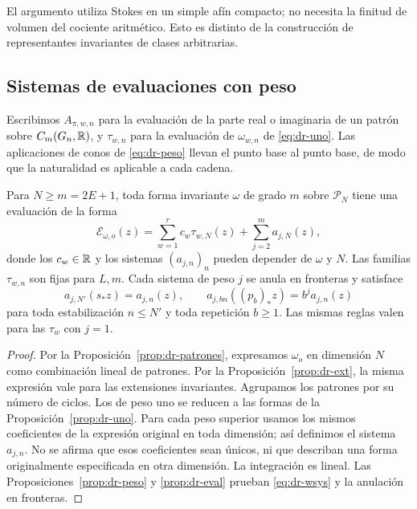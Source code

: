 El argumento utiliza Stokes en un simple afín compacto; no necesita la finitud de volumen del cociente aritmético. Esto es distinto de la construcción de representantes invariantes de clases arbitrarias.

\subsection{Sistemas de evaluaciones con peso}

Escribimos $A_{\pi,w,n}$ para la evaluación de la parte real o imaginaria de un patrón sobre $C_m(G_n,\mathbb{R})$, y $\tau_{w,n}$ para la evaluación de $\omega_{w,n}$ de \eqref{eq:dr-uno}. Las aplicaciones de conos de \eqref{eq:dr-peso} llevan el punto base al punto base, de modo que la naturalidad es aplicable a cada cadena.

\begin{teorema}
\label{thm:dr-wt}
Para $N\ge m=2E+1$, toda forma invariante $\omega$ de grado $m$ sobre $\mathcal P_N$ tiene una evaluación de la forma
\begin{equation}
 \mathcal E_{\omega,o}(z)=\sum_{w=1}^r c_w\tau_{w,N}(z)
               +\sum_{j=2}^m a_{j,N}(z),
 \label{eq:dr-decomp}
\end{equation}
donde los $c_w\in\mathbb{R}$ y los sistemas $(a_{j,n})_n$ pueden depender de $\omega$ y $N$. Las familias $\tau_{w,n}$ son fijas para $L,m$. Cada sistema de peso $j$ se anula en fronteras y satisface
\begin{equation}
 a_{j,N'}(s_*z)=a_{j,n}(z),\qquad
 a_{j,bn}((p_b)_*z)=b^j a_{j,n}(z)
 \label{eq:dr-wsys}
\end{equation}
para toda estabilización $n\le N'$ y toda repetición $b\ge1$. Las mismas reglas valen para las $\tau_w$ con $j=1$.
\end{teorema}
\begin{proof}
Por la Proposición~\ref{prop:dr-patrones}, expresamos $\omega_o$ en dimensión $N$ como combinación lineal de patrones. Por la Proposición~\ref{prop:dr-ext}, la misma expresión vale para las extensiones invariantes. Agrupamos los patrones por su número de ciclos. Los de peso uno se reducen a las formas de la Proposición~\ref{prop:dr-uno}. Para cada peso superior usamos los mismos coeficientes de la expresión original en toda dimensión; así definimos el sistema $a_{j,n}$. No se afirma que esos coeficientes sean únicos, ni que describan una forma originalmente especificada en otra dimensión. La integración es lineal. Las Proposiciones~\ref{prop:dr-peso} y \ref{prop:dr-eval} prueban \eqref{eq:dr-wsys} y la anulación en fronteras.
\end{proof}

